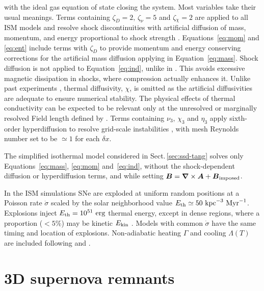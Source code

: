 \documentclass[fleqn,usenatbib]{mnras}
\newcommand\ESK{E_{\rm kin}}
\newcommand\EST{E_{\rm th}}
\newcommand{\vect}[1]{{{\mbox{\boldmath $#1$}}}}%
\newcommand\kpc{~ {\rm kpc}}
\newcommand\dx{ {\delta x}}
\newcommand\Myr{~ {\rm Myr}}
\newcommand\erg{~ {\rm erg}}
\begin{document}
 with the ideal gas equation of state closing the system.
 Most variables take their usual meanings.
 Terms containing $\zeta_D{=2},\,\zeta_\nu{=5}$ and $\zeta{_\chi=2}$
 {are applied to all ISM models and} resolve shock discontinuities with
 artificial diffusion of mass, momentum, and energy proportional to shock
 strength \citep[see][for details]{GMKSH20}.
 {Equations~\eqref{eq:mom} and \eqref{eq:ent} include terms with $\zeta_D$}
 {to} {provide momentum and energy conserving corrections for} {the}
 {artificial mass diffusion applying in Equation~\eqref{eq:mass}.}
 Shock diffusion is not applied to Equation~\eqref{eq:ind}{, unlike} {in}
 {\citet{Gent:2013b}.} {This avoids} {excessive magnetic dissipation in
   shocks, where compression actually enhances it.}
  {Unlike past} experiments \citep{Gent:2013b,Gent:2013a,GMKSH20},
 thermal diffusivity, $\chi$, {is omitted as} the artificial diffusivities
 are adequate to ensure numerical stability.
 {The} physical effects of thermal conductivity can be expected to be
 relevant only at the unresolved or marginally resolved Field length defined
 by \citet[][named after George Field, not the magnetic field]{BM90}.
 Terms containing $\nu_3,\,\chi_3$ and $\eta_3$ apply sixth-order hyperdiffusion
 to resolve grid-scale instabilities \citep[see, e.g.,][]{ABGS02,HB04}, {
   with mesh Reynolds number
% 
      set to be
$\simeq1$ for each $\dx$}.

 {The simplified isothermal model considered in
Sect.\,\ref{sec:ssd-tang} solves only Equations~{\eqref{eq:mass},}
 \eqref{eq:mom} and~\eqref{eq:ind}, without the shock-dependent diffusion or
 hyperdiffusion terms, and while setting
 $\vect{B}=\vect\nabla\times\vect{A}+\vect{B}_{\rm imposed}$.}

 {In the ISM simulations} SNe are exploded at {uniform} random positions
 at a Poisson rate $\dot\sigma$ {scaled by} the solar neighborhood
 value $\EST\simeq 50\kpc^{-3}\Myr^{-1}$.
 Explosions inject $\EST = 10^{51}\erg$ thermal energy, except in
 dense regions, where a proportion {($<5\%$) may be} kinetic $\ESK$ 
 \citep[see][]{GMKSH20}.
 {Models with common $\dot\sigma$ have the same timing and location of
 explosions.}
 Non-adiabatic heating $\Gamma$ and cooling $\Lambda (T)$ are included
 \citep{Gent:2013b} following \citet{Wolfire:1995} and \citet{Sarazin:1987}.

\section{3D supernova remnants
\label{sect:snowplough}}
\end{document}
